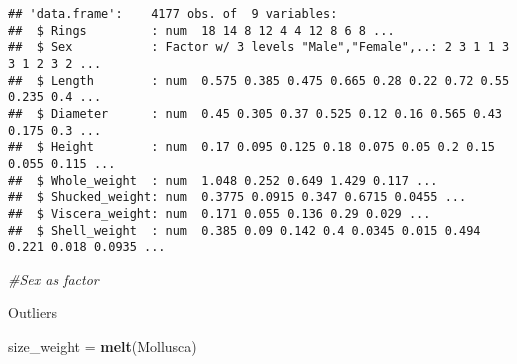 \documentclass[
]{article}
\newenvironment{Shaded}{\begin{snugshade}}{\end{snugshade}}
\newcommand{\CommentTok}[1]{\textcolor[rgb]{0.56,0.35,0.01}{\textit{#1}}}
\newcommand{\DataTypeTok}[1]{\textcolor[rgb]{0.13,0.29,0.53}{#1}}
\newcommand{\KeywordTok}[1]{\textcolor[rgb]{0.13,0.29,0.53}{\textbf{#1}}}
\newcommand{\NormalTok}[1]{#1}
\newcommand{\OperatorTok}[1]{\textcolor[rgb]{0.81,0.36,0.00}{\textbf{#1}}}
\newcommand{\StringTok}[1]{\textcolor[rgb]{0.31,0.60,0.02}{#1}}
\begin{document}
\begin{Shaded}
\end{Shaded}

\begin{verbatim}
## 'data.frame':    4177 obs. of  9 variables:
##  $ Rings         : num  18 14 8 12 4 4 12 8 6 8 ...
##  $ Sex           : Factor w/ 3 levels "Male","Female",..: 2 3 1 1 3 3 1 2 3 2 ...
##  $ Length        : num  0.575 0.385 0.475 0.665 0.28 0.22 0.72 0.55 0.235 0.4 ...
##  $ Diameter      : num  0.45 0.305 0.37 0.525 0.12 0.16 0.565 0.43 0.175 0.3 ...
##  $ Height        : num  0.17 0.095 0.125 0.18 0.075 0.05 0.2 0.15 0.055 0.115 ...
##  $ Whole_weight  : num  1.048 0.252 0.649 1.429 0.117 ...
##  $ Shucked_weight: num  0.3775 0.0915 0.347 0.6715 0.0455 ...
##  $ Viscera_weight: num  0.171 0.055 0.136 0.29 0.029 ...
##  $ Shell_weight  : num  0.385 0.09 0.142 0.4 0.0345 0.015 0.494 0.221 0.018 0.0935 ...
\end{verbatim}

\begin{Shaded}
\begin{Highlighting}[]
\CommentTok{#Sex as factor}
\end{Highlighting}
\end{Shaded}

Outliers

\begin{Shaded}
\begin{Highlighting}[]
\NormalTok{size_weight =}\StringTok{ }\KeywordTok{melt}\NormalTok{(Mollusca)}
\end{Highlighting}
\end{Shaded}
\end{document}
